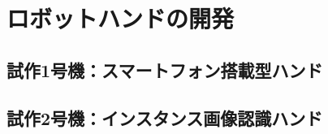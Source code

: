 \chapter{ロボットハンドの開発}
\label{chap_result}

\section{試作1号機：スマートフォン搭載型ハンド}


\section{試作2号機：インスタンス画像認識ハンド}



